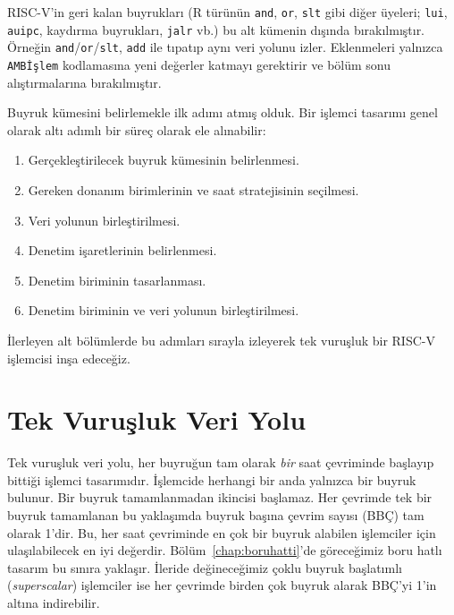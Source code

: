RISC-V'in geri kalan buyrukları (R türünün \texttt{and}, \texttt{or}, \texttt{slt} gibi diğer üyeleri; \texttt{lui}, \texttt{auipc}, kaydırma buyrukları, \texttt{jalr} vb.) bu alt kümenin dışında bırakılmıştır. Örneğin \texttt{and}/\texttt{or}/\texttt{slt}, \texttt{add} ile tıpatıp aynı veri yolunu izler. Eklenmeleri yalnızca \texttt{AMBİşlem} kodlamasına yeni değerler katmayı gerektirir ve bölüm sonu alıştırmalarına bırakılmıştır.

Buyruk kümesini belirlemekle ilk adımı atmış olduk. Bir işlemci tasarımı genel olarak altı adımlı bir süreç olarak ele alınabilir:
\begin{enumerate}
    \item Gerçekleştirilecek buyruk kümesinin belirlenmesi.
    \item Gereken donanım birimlerinin ve saat stratejisinin seçilmesi.
    \item Veri yolunun birleştirilmesi.
    \item Denetim işaretlerinin belirlenmesi.
    \item Denetim biriminin tasarlanması.
    \item Denetim biriminin ve veri yolunun birleştirilmesi.
\end{enumerate}
İlerleyen alt bölümlerde bu adımları sırayla izleyerek tek vuruşluk bir RISC-V işlemcisi inşa edeceğiz.

\section{Tek Vuruşluk Veri Yolu}
\label{sec:tek-vurusluk}

Tek vuruşluk veri yolu, her buyruğun tam olarak \emph{bir} saat çevriminde başlayıp bittiği işlemci tasarımıdır. İşlemcide herhangi bir anda yalnızca bir buyruk bulunur. Bir buyruk tamamlanmadan ikincisi başlamaz. Her çevrimde tek bir buyruk tamamlanan bu yaklaşımda buyruk başına çevrim sayısı (BBÇ) tam olarak 1'dir. Bu, her saat çevriminde en çok bir buyruk alabilen işlemciler için ulaşılabilecek en iyi değerdir. Bölüm~\ref{chap:boruhatti}'de göreceğimiz boru hatlı tasarım bu sınıra yaklaşır. İleride değineceğimiz çoklu buyruk başlatımlı (\emph{superscalar}) işlemciler ise her çevrimde birden çok buyruk alarak BBÇ'yi 1'in altına indirebilir.

